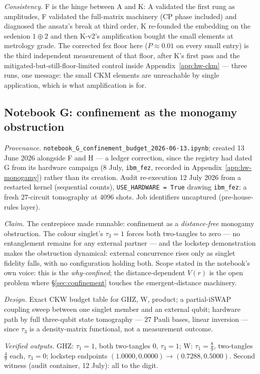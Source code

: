 \emph{Consistency.} F is the hinge between A and K: A validated the first rung as amplitudes, F
validated the full-matrix machinery (CP phase included) and diagnosed the ansatz's break at third
order, K re-founded the embedding on the sedenion $1 \oplus 2$ and then K-v2's amplification
bought the small elements at metrology grade. The corrected fez floor here ($P \approx 0.01$ on
every small entry) is the third independent measurement of that floor, after K's first pass and
the mitigated-but-still-floor-limited control inside Appendix~\ref{app:hw-ckm} --- three runs,
one message: the small CKM elements are unreachable by single application, which is what
amplification is for.

\subsection{Notebook G: confinement as the monogamy obstruction}
\label{app:nb-G}

\emph{Provenance.} \texttt{notebook\_G\_confinement\_budget\_2026-06-13.ipynb}; created 13 June
2026 alongside F and H --- a ledger correction, since the registry had dated G from its hardware
campaign (8 July, \texttt{ibm\_fez}, recorded in Appendix~\ref{app:hw-monogamy}) rather than its
creation. Audit re-execution 12 July 2026 from a restarted kernel (sequential counts),
\texttt{USE\_HARDWARE = True} drawing \texttt{ibm\_fez}: a fresh $27$-circuit tomography at
$4096$ shots. Job identifiers uncaptured (pre-house-rules layer).

\emph{Claim.} The centrepiece made runnable: confinement as a \emph{distance-free} monogamy
obstruction. The colour singlet's $\tau_{3} = 1$ forces both two-tangles to zero --- no
entanglement remains for any external partner --- and the lockstep demonstration makes the
obstruction dynamical: external concurrence rises only as singlet fidelity falls, with no
configuration holding both. Scope stated in the notebook's own voice: this is the
\emph{why-confined}; the distance-dependent $V(r)$ is the open problem where
\S\ref{sec:confinement} touches the emergent-distance machinery.

\emph{Design.} Exact CKW budget table for GHZ, W, product; a partial-iSWAP coupling sweep between
one singlet member and an external qubit; hardware path by full three-qubit state tomography ---
$27$ Pauli bases, linear inversion --- since $\tau_{3}$ is a density-matrix functional, not a
measurement outcome.

\emph{Verified outputs.} GHZ: $\tau_{1} = 1$, both two-tangles $0$, $\tau_{3} = 1$; W:
$\tau_{1} = \tfrac89$, two-tangles $\tfrac49$ each, $\tau_{3} = 0$; lockstep endpoints
$(1.0000, 0.0000) \to (0.7288, 0.5000)$. Second witness (audit container, 12 July): all to the
digit.

